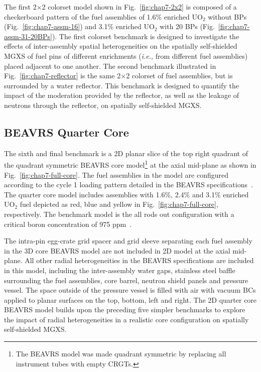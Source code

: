 The first 2$\times$2 colorset model shown in Fig.~\ref{fig:chap7-2x2} is composed of a checkerboard pattern of the fuel assemblies of 1.6\% enriched UO$_2$ without \acp{BP} (Fig.~\ref{fig:chap7-assm-16}) and 3.1\% enriched UO$_2$ with 20 \acp{BP} (Fig.~\ref{fig:chap7-assm-31-20BPs}). The first colorset benchmark is designed to investigate the effects of inter-assembly spatial heterogeneities on the spatially self-shielded \ac{MGXS} of fuel pins of different enrichments (\textit{i.e.}, from different fuel assemblies) placed adjacent to one another. The second benchmark illustrated in Fig.~\ref{fig:chap7-reflector} is the same 2$\times$2 colorset of fuel assemblies, but is surrounded by a water reflector. This benchmark is designed to quantify the impact of the moderation provided by the reflector, as well as the leakage of neutrons through the reflector, on spatially self-shielded \ac{MGXS}.

\subsection{BEAVRS Quarter Core}
\label{subsec:chap7-full-core}

The sixth and final benchmark is a 2D planar slice of the top right quadrant of the quadrant symmetric \ac{BEAVRS} core model\footnote{The \ac{BEAVRS} model was made quadrant symmetric by replacing all instrument tubes with empty \acp{CRGT}.} at the axial mid-plane as shown in Fig.~\ref{fig:chap7-full-core}. The fuel assemblies in the model are configured according to the cycle 1 loading pattern detailed in the \ac{BEAVRS} specifications~\cite{horelik2013beavrs}. The quarter core model includes assemblies with 1.6\%, 2.4\% and 3.1\% enriched UO$_2$ fuel depicted as red, blue and yellow in Fig.~\ref{fig:chap7-full-core}, respectively. The benchmark model is the all rods out configuration with a critical boron concentration of 975 ppm~\cite{horelik2013beavrs}.

The intra-pin egg-crate grid spacer and grid sleeve separating each fuel assembly in the 3D core \ac{BEAVRS} model are not included in 2D model at the axial mid-plane. All other radial heterogeneities in the \ac{BEAVRS} specifications are included in this model, including the inter-assembly water gaps, stainless steel baffle surrounding the fuel assemblies, core barrel, neutron shield panels and pressure vessel. The space outside of the pressure vessel is filled with air with vacuum \acp{BC} applied to planar surfaces on the top, bottom, left and right. The 2D quarter core \ac{BEAVRS} model builds upon the preceding five simpler benchmarks to explore the impact of radial heterogeneities in a realistic core configuration on spatially self-shielded \ac{MGXS}.


